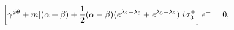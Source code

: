 \begin{equation}
\left[
\gamma^{\phi\theta}+m[(\alpha+\beta)+{1\over 2}(\alpha-\beta)(e^{\lambda_2-\lambda_3}+e^{\lambda_3-\lambda_2})]i\sigma_3^+\right]\epsilon^+=0,\label{Atwist0}
\end{equation}


